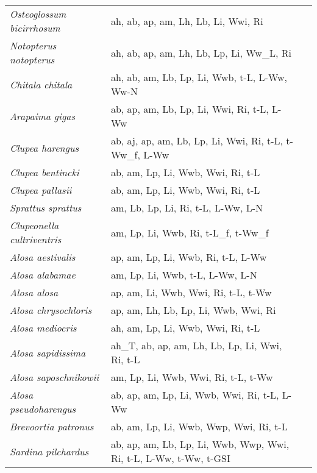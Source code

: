 {\begin{longtable}[c]{p{3.5cm}p{5.5cm}p{5.5cm}}
\emph{Osteoglossum bicirrhosum} &  ah, ab, ap, am, Lh, Lb, Li, Wwi, Ri & \citet{Yanw2013} \\
\emph{Notopterus notopterus} &  ah, ab, ap, am, Lh, Lb, Lp, Li, Ww\_L, Ri & \citet{Yanw2013} \\
\emph{Chitala chitala} &  ah, ab, am, Lb, Lp, Li, Wwb, t-L, L-Ww, Ww-N & \citet{SarkDeep2006,SarkNegi2008,HussShak2015} \\
\emph{Arapaima gigas} &  ab, ap, am, Lb, Lp, Li, Wwi, Ri, t-L, L-Ww & \citet{AranCast2010,Quei2000} \\
\emph{Clupea harengus} &  ab, aj, ap, am, Lb, Lp, Li, Wwi, Ri, t-L, t-Ww\_f, L-Ww & \citet{Geff2002,Blax1968,EngeHein2004,Lea1930,BigeBrad1963,Koli1990,Teal2003} \\
\emph{Clupea bentincki} &  ab, am, Lp, Li, Wwb, Wwi, Ri, t-L & \citet{CastCubi2010} \\
\emph{Clupea pallasii} &  ab, am, Lp, Li, Wwb, Wwi, Ri, t-L & \citet{Cher2017} \\
\emph{Sprattus sprattus} &  am, Lb, Lp, Li, Ri, t-L, L-Ww, L-N & \citet{Tors1992,Dulc1998,Prod1997} \\
\emph{Clupeonella cultriventris} &  am, Lp, Li, Wwb, Ri, t-L\_f, t-Ww\_f & \citet{KiyaOsip2006} \\
\emph{Alosa aestivalis} &  ap, am, Lp, Li, Wwb, Ri, t-L, L-Ww & \citet{Mess1977,WallYeag1990} \\
\emph{Alosa alabamae} &  am, Lp, Li, Wwb, t-L, L-Ww, L-N & \citet{Ingr2007} \\
\emph{Alosa alosa} &  ap, am, Li, Wwb, Wwi, Ri, t-L, t-Ww & \citet{Laak2009} \\
\emph{Alosa chrysochloris} &  ap, am, Lh, Lb, Lp, Li, Wwb, Wwi, Ri & \citet{WallYeag1990} \\
\emph{Alosa mediocris} &  ah, am, Lp, Li, Wwb, Wwi, Ri, t-L & \citet{Mans1962} \\
\emph{Alosa sapidissima} &  ah\_T, ab, ap, am, Lh, Lb, Lp, Li, Wwi, Ri, t-L & \citet{SavoCrec2004,MaltDaig2010} \\
\emph{Alosa saposchnikowii} &  am, Lp, Li, Wwb, Wwi, Ri, t-L, t-Ww & \citet{MalkAndr2008} \\
\emph{Alosa pseudoharengus} &  ab, ap, am, Lp, Li, Wwb, Wwi, Ri, t-L, L-Ww & \citet{WallYeag1990,Mess1977} \\
\emph{Brevoortia patronus} &  ab, am, Lp, Li, Wwb, Wwp, Wwi, Ri, t-L & \citet{Warl1988,Hett1984} \\
\emph{Sardina pilchardus} &  ab, ap, am, Lb, Lp, Li, Wwb, Wwp, Wwi, Ri, t-L, L-Ww, t-Ww, t-GSI & \citet{ReMene2008,SilvSant2006,Dess2015,SilvCarr2008,NuneSilv2011,ICES2012,Quei2017} \\

\end{longtable}}
